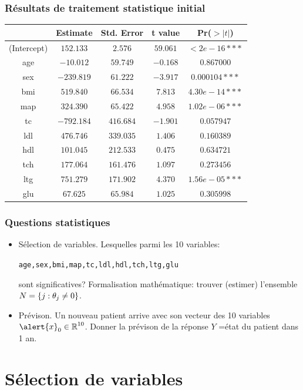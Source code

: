 \begin{frame}
\frametitle{Résultats de traitement statistique initial}
\begin{tabular}{|c||c|c|c|c|}
\hline &Estimate&Std. Error&t value&Pr($>|t|$)\\\hline
(Intercept) &$152.133$&$2.576$&$59.061$&$< 2e-16***$\\
age&$-10.012$&$59.749$&$ -0.168$&$0.867000$\\\hline
sex &$-239.819$&$61.222$&$-3.917$&$0.000104***$\\
bmi&$519.840$&$66.534$&$7.813$&$4.30e-14***$\\\hline
map&$324.390$&$65.422$&$4.958$&$1.02e-06***$\\
tc&$-792.184$&$416.684$&$-1.901$&$0.057947$\\\hline
ldl&$476.746$&$339.035$&$1.406$&$0.160389$\\
hdl&$101.045$&$212.533 $&$0.475$&$0.634721$\\\hline
tch&$177.064$&$161.476$&$ 1.097$&$0.273456$\\
ltg&$751.279$&$ 171.902$&$4.370$&$ 1.56e-05***$\\\hline
glu&$67.625$&$ 65.984$&$1.025$&$0.305998$\\\hline
\end{tabular}
\end{frame}

\begin{frame}
\frametitle{Questions statistiques}
\begin{itemize}
\item \alert{Sélection de variables.} Lesquelles parmi les 10
variables:\\\vspace{3mm}
\centerline{\texttt{age,sex,bmi,map,tc,ldl,hdl,tch,ltg,glu}}\vspace{3mm}
sont significatives? Formalisation mathématique: trouver (estimer)
l'ensemble $N= \{j: \theta_{j}\ne 0\}$.
\item \alert{Prévison.} Un nouveau patient arrive avec son vecteur
des 10 variables $\alert{x}_0\in \R^{10}$. Donner la prévison de la
réponse $Y$ =état du patient dans 1 an.
\end{itemize}
\end{frame}

\section{Sélection de variables}

